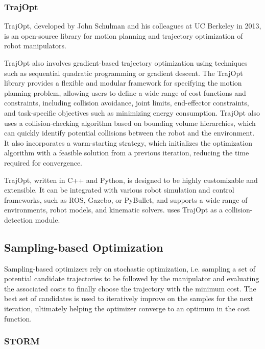 \subsubsection{TrajOpt}\label{sec:TrajOpt}

TrajOpt\cite{TrajOpt}, developed by John Schulman and his colleagues at UC Berkeley in 2013, is an open-source library for motion planning and trajectory optimization of robot manipulators.

TrajOpt also involves gradient-based trajectory optimization using techniques such as sequential quadratic programming or gradient descent. The TrajOpt library provides a flexible and modular framework for specifying the motion planning problem, allowing users to define a wide range of cost functions and constraints, including collision avoidance, joint limits, end-effector constraints, and task-specific objectives such as minimizing energy consumption. TrajOpt also uses a collision-checking algorithm based on bounding volume hierarchies, which can quickly identify potential collisions between the robot and the environment. It also incorporates a warm-starting strategy, which initializes the optimization algorithm with a feasible solution from a previous iteration, reducing the time required for convergence.

TrajOpt, written in C++ and Python, is designed to be highly customizable and extensible. It can be integrated with various robot simulation and control frameworks, such as ROS, Gazebo, or PyBullet, and supports a wide range of environments, robot models, and kinematic solvers. \cite{OpenRAVE} uses TrajOpt as a collision-detection module.

\subsection{Sampling-based Optimization}\label{sec:bg-sampling-manipulator}

Sampling-based optimizers rely on stochastic optimization, i.e. sampling a set of potential candidate trajectories to be followed by the manipulator and evaluating the associated costs to finally choose the trajectory with the minimum cost. The best set of candidates is used to iteratively improve on the samples for the next iteration, ultimately helping the optimizer converge to an optimum in the cost function. 

\subsubsection{STORM}

